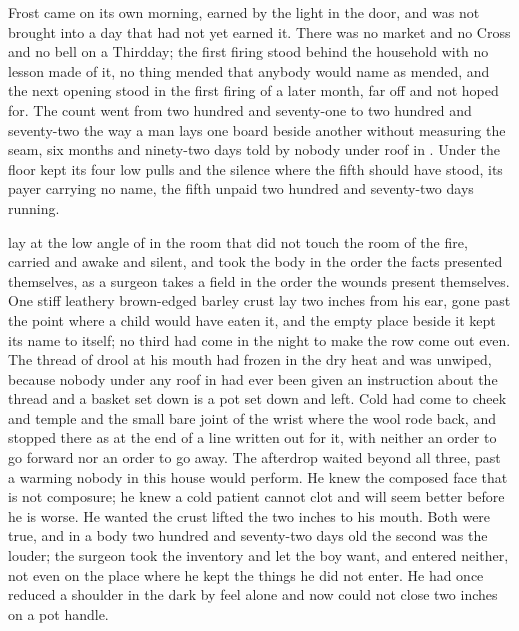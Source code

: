 
Frost came on its own morning, earned by the light in the door, and was not brought into a day that had not yet earned it. There was no market and no Cross and no bell on a Thirdday; the first firing stood behind the household with no lesson made of it, no thing mended that anybody would name as mended, and the next opening stood in the first firing of a later month, far off and not hoped for. The count went from two hundred and seventy-one to two hundred and seventy-two the way a man lays one board beside another without measuring the seam, six months and ninety-two days told by nobody under  roof in . Under the floor  kept its four low pulls and the silence where the fifth should have stood, its payer carrying no name, the fifth unpaid two hundred and seventy-two days running.

 lay at the low angle of  in the room that did not touch the room of the fire, carried and awake and silent, and took the body in the order the facts presented themselves, as a surgeon takes a field in the order the wounds present themselves. One stiff leathery brown-edged barley crust lay two inches from his ear, gone past the point where a child would have eaten it, and the empty place beside it kept its name to itself; no third had come in the night to make the row come out even. The thread of drool at his mouth had frozen in the dry heat and was unwiped, because nobody under any roof in  had ever been given an instruction about the thread and a basket set down is a pot set down and left. Cold had come to cheek and temple and the small bare joint of the wrist where the wool rode back, and stopped there as at the end of a line written out for it, with neither an order to go forward nor an order to go away. The afterdrop waited beyond all three, past a warming nobody in this house would perform. He knew the composed face that is not composure; he knew a cold patient cannot clot and will seem better before he is worse. He wanted the crust lifted the two inches to his mouth. Both were true, and in a body two hundred and seventy-two days old the second was the louder; the surgeon took the inventory and let the boy want, and entered neither, not even on the place where he kept the things he did not enter. He had once reduced a shoulder in the dark by feel alone and now could not close two inches on a pot handle.

